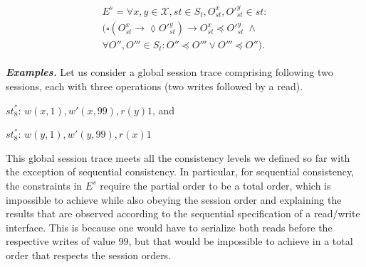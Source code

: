 \documentclass[journal,compsoc]{IEEEtran}
\begin{document}
\begin{align}\label{eqn:SC}
\begin{split}
      E^{s} =  %
   \forall x,y \in \mathcal{X}, \mathit{st} \in \mathit{S_t}, O_\mathit{st}^x, O'^{y}_\mathit{st} \in \mathit{st}:  \\ 
     \big( \square \left( O_\mathit{st}^x \rightarrow \lozenge O'^{y}_\mathit{st} \right)
 \rightarrow O_\mathit{st}^x \preccurlyeq O'^{y}_\mathit{st}  \; \wedge
 \\ 
 \forall O'', O''' \in \mathit{S_t}:
 O'' \preccurlyeq O''' \vee O''' \preccurlyeq O'' \big). %
\end{split}
\end{align}

\noindent \emph{\textbf{Examples.}}
Let us consider a global session trace comprising following two sessions, each with three operations (two writes followed by a read). 
 
 $\mathit{st}_8^{''}$:   $w(x, 1), w'(x,99), r(y){1}$, and 
 
 $\mathit{st}_8^{''}$:  $w(y, 1), w'(y,99), r(x){1}$
 
 This global session trace meets all the consistency levels we defined so far with the exception of sequential consistency.
 In particular, for sequential consistency, the constraints in $E^s$ require the partial order to be a total order, which is impossible to achieve while also obeying the session order and explaining the results that are observed according to the sequential specification of a read/write interface. This is because one would have to serialize both reads before the respective writes of value 99, but that would be impossible to achieve in a total order that respects the session orders.
\end{document}
